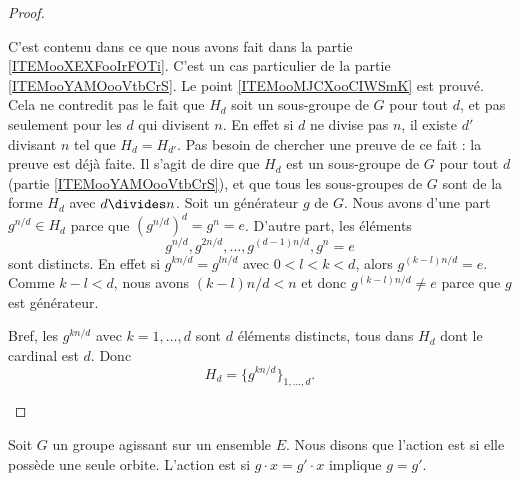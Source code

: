\begin{proof}
\begin{subproof}
        \spitem[\( \Card(H_d)=d\)]
        C'est contenu dans ce que nous avons fait dans la partie \ref{ITEMooXEXFooIrFOTi}.
        C'est un cas particulier de la partie \ref{ITEMooYAMOooVtbCrS}.
        \spitem[Note]
        Le point \ref{ITEMooMJCXooCIWSmK} est prouvé. Cela ne contredit pas le fait que \( H_d\) soit un sous-groupe de \( G\) pour tout \( d\), et pas seulement pour les \( d\) qui divisent \( n\). En effet si \( d\) ne divise pas \( n\), il existe \( d'\) divisant \( n\) tel que \( H_d=H_{d'}\). Pas besoin de chercher une preuve de ce fait : la preuve est déjà faite. Il s'agit de dire que \( H_d\) est un sous-groupe de \( G\) pour tout \( d\) (partie \ref{ITEMooYAMOooVtbCrS}), et que tous les sous-groupes de \( G\) sont de la forme \( H_d\) avec \( d\divides n\).
        Soit un générateur \( g\) de \( G\). Nous avons d'une part \( g^{n/d}\in H_d\) parce que \( (g^{n/d})^d=g^n=e\). D'autre part, les éléments
        \begin{equation}
            g^{n/d}, g^{2n/d},\ldots, g^{(d-1)n/d}, g^{n}=e
        \end{equation}
        sont distincts. En effet si \( g^{kn/d}=g^{ln/d}\) avec \( 0<l<k<d\), alors \( g^{(k-l)n/d}=e\). Comme \( k-l<d\),  nous avons \( (k-l)n/d<n\) et donc \( g^{(k-l)n/d}\neq e\) parce que \( g\) est générateur.

        Bref, les \( g^{kn/d}\) avec \( k=1,\ldots, d\) sont \( d\) éléments distincts, tous dans \( H_d\) dont le cardinal est \( d\). Donc 
        \begin{equation}
            H_d=\{ g^{kn/d} \}_{1,\ldots, d}.
        \end{equation}
    \end{subproof}
\end{proof}


\begin{definition}      \label{DEFooQDHPooCfDEuL}
	Soit \( G\) un groupe agissant sur un ensemble \( E\). Nous disons que l'action est  si elle possède une seule orbite. L'action est  si \( g\cdot x=g'\cdot x\) implique \( g=g'\).
\end{definition}
